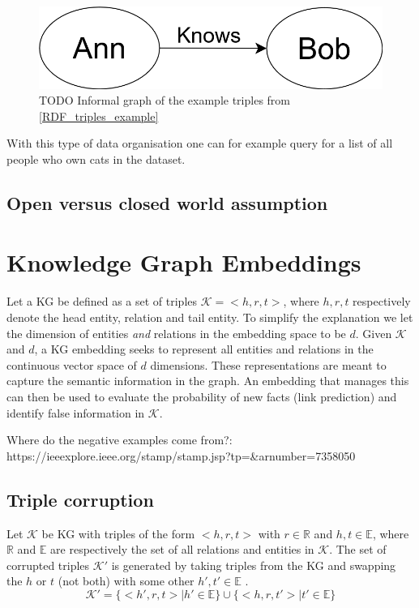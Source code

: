 \begin{figure}
\centering
    \includegraphics[scale=0.3]{figures/RDF_triple}
    \caption{TODO Informal graph of the example triples from \ref{RDF_triples_example}}
    
    \label{fig:KGexample}
\end{figure}

With this type of data organisation one can for example query for a list of all people who own cats in the dataset. 
\subsection{Open versus closed world assumption}

\section{Knowledge Graph Embeddings}
Let a KG be defined as a set of triples $\mathcal{K}={<h, r, t>}$, where $h, r, t$ respectively denote the head entity, relation and tail entity. To simplify the explanation we let the dimension of entities \emph{and} relations in the embedding space to be $d$.
Given $\mathcal{K}$ and $d$, a KG embedding seeks to represent all entities and relations in the continuous vector space of $d$ dimensions. These representations are meant to capture the semantic information in the graph. An embedding that manages this can then be used to evaluate the probability of new facts (link prediction) and identify false information in $\mathcal{K}$.




Where do the negative examples come from?: https://ieeexplore.ieee.org/stamp/stamp.jsp?tp=&arnumber=7358050
\subsection{Triple corruption}
Let $\mathcal{K}$ be KG with triples of the form $<h, r, t>$ with $r\in \mathbb{R}$ and $h, t \in \mathbb{E}$, where $\mathbb{R}$ and $\mathbb{E}$ are respectively the set of all relations and entities in $\mathcal{K}$. The set of corrupted triples $\mathcal{K'}$ is generated by taking triples from the KG and swapping the $h$ or $t$ (not both) with some other $h', t' \in \mathbb{E}$ \cite{TransE}.
\begin{equation}
   \mathcal{K'} =\{<h', r, t> |h' \in \mathbb{E} \} \cup \{<h, r , t'> | t' \in \mathbb{E}\}
\end{equation}



